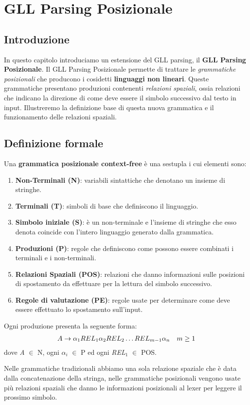 \chapter{GLL Parsing Posizionale}
\section{Introduzione}
In questo capitolo introduciamo un estensione del GLL parsing, il \textbf{GLL Parsing Posizionale}. Il GLL Parsing Posizionale permette di trattare le \textit{grammatiche posizionali} che producono i cosidetti \textbf{linguaggi non lineari}. Queste grammatiche presentano produzioni contenenti \textit{relazioni spaziali}, ossia relazioni che indicano la direzione di come deve essere il simbolo successivo dal testo in input. Illustreremo la definizione base di questa nuova grammatica e il funzionamento delle relazioni spaziali.
\section{Definizione formale}
Una \textbf{grammatica posizionale context-free} è una sestupla \cite{pubblicazione: tomita} i cui elementi sono:
\begin{enumerate}
	\item \textbf{Non-Terminali (N)}: variabili sintattiche che denotano un insieme di stringhe.
	\item \textbf{Terminali (T)}: simboli di base che definiscono il linguaggio.
	\item \textbf{Simbolo iniziale (S)}: è un non-terminale e l'insieme di stringhe che esso denota coincide con l'intero linguaggio generato dalla grammatica.
	\item \textbf{Produzioni (P)}: regole che definiscono come possono essere combinati i terminali e i non-terminali.
	\item \textbf{Relazioni Spaziali (POS)}: relazioni che danno informazioni sulle posizioni di spostamento da effettuare per la lettura del simbolo successivo.
	\item \textbf{Regole di valutazione (PE)}: regole usate per determinare come deve essere effettuato lo spostamento sull'input.
\end{enumerate}
Ogni produzione presenta la seguente forma:
\begin{align}
	A \to \alpha_{1} REL_1 \alpha_{2} REL_2 \dots REL_{m-1} \alpha_{n} \quad m \ge 1 \notag 
\end{align}
dove \textit{A} $\in$ N, ogni $\alpha_i$ $\in$ P ed ogni \textit{REL}$_1$ $\in$ POS.\par
\vspace{0.3cm}
\noindent Nelle grammatiche tradizionali abbiamo una sola relazione spaziale che è data dalla concatenazione della stringa, nelle grammatiche posizionali vengono usate più relazioni spaziali che danno le informazioni posizionali al lexer per leggere il prossimo simbolo.
